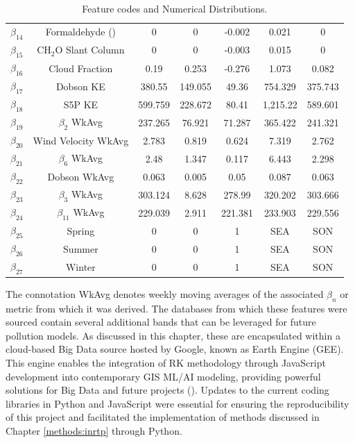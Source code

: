 \begin{table}[h!]
\begin{tabular}{ccccccc}
        $\beta_{14}$ & Formaldehyde () & 0 & 0	& -0.002 & 0.021 & 0 \\
        $\beta_{15}$ & CH$_2$O Slant Column & 0 & 0	& -0.003 & 0.015 & 0 \\
        $\beta_{16}$ & Cloud Fraction & 0.19	& 0.253 & -0.276 & 1.073 & 0.082 \\
        $\beta_{17}$ & Dobson KE & 380.55	& 149.055 & 49.36 & 754.329 & 375.743 \\
        $\beta_{18}$ & S5P KE & 599.759	& 228.672 & 80.41 & 1,215.22 & 589.601 \\
        $\beta_{19}$ & $\beta_{2}$ WkAvg & 237.265	& 76.921 & 71.287 & 365.422 & 241.321 \\
        $\beta_{20}$ & Wind Velocity WkAvg & 2.783	& 0.819 & 0.624 & 7.319 & 2.762 \\
        $\beta_{21}$ & $\beta_{6}$ WkAvg & 2.48	& 1.347 & 0.117 & 6.443 & 2.298 \\
        $\beta_{22}$ & Dobson WkAvg & 0.063	& 0.005 & 0.05 & 0.087 & 0.063 \\
        $\beta_{23}$ & $\beta_{3}$ WkAvg & 303.124	& 8.628 & 278.99 & 320.202 & 303.666 \\
        $\beta_{24}$ & $\beta_{11}$ WkAvg & 229.039	& 2.911 & 221.381 & 233.903 & 229.556 \\
        $\beta_{25}$ & Spring & 0 & 0 & 1 & SEA & SON \\
        $\beta_{26}$ & Summer & 0 & 0 & 1 & SEA & SON \\
        $\beta_{27}$ & Winter & 0 & 0 & 1 & SEA & SON \\
       \hline
    \end{tabular}
    \caption{Feature codes and Numerical Distributions.}
    \label{tab:variable_codes}
\end{table} The connotation WkAvg denotes weekly moving averages of the associated $\beta_{n}$ or metric from which it was derived. The databases from which these features were sourced contain several additional bands that can be leveraged for future pollution models. As discussed in this chapter, these are encapsulated within a cloud-based Big Data source hosted by Google, known as Earth Engine (GEE). This engine enables the integration of RK methodology through JavaScript development into contemporary GIS ML/AI modeling, providing powerful solutions for Big Data and future projects (\cite{xu_mapping_2023}). Updates to the current coding libraries in Python and JavaScript were essential for ensuring the reproducibility of this project and facilitated the implementation of methods discussed in Chapter \ref{methods:inrtp} through Python. 
